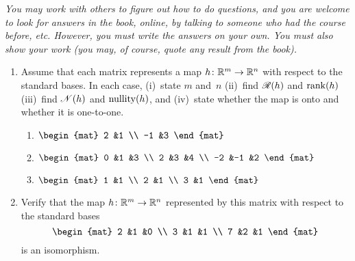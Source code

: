 \documentclass[11pt]{article}
\begin{document}
\thispagestyle{empty}

\vspace*{3ex}
\textit{You may work with others to figure out how to do questions, 
and you are welcome to look for answers in the book, online, by talking
to someone who had the course before, etc.
However, you must write 
the answers on your own.
You must also show your work (you may, of course, 
quote any result from the book).}

\begin{enumerate}
\item
  Assume that each matrix represents a map $\mbox{$h\colon \mathbb{R}^m\to \mathbb{R}^n$}$
  with respect to the standard bases.
  In each case, 
  (i)~state $m$ and~$n$
  (ii)~find $\mathscr{R}(h)$ and $\operatorname{rank}(h)$
  (iii)~find $\mathscr{N}(h)$ and $\operatorname{nullity}(h)$,
  and (iv)~state whether the map is onto and whether it is one-to-one.
  \begin{enumerate}
  \item
    $
    \begin{mat}
      2  &1  \\ 
      -1 &3
    \end{mat}
    $
  \item
    $
    \begin{mat}
      0  &1  &3  \\ 
      2  &3  &4  \\
     -2  &-1 &2 
    \end{mat}
    $
  \item
    $
    \begin{mat}
      1  &1  \\ 
      2  &1  \\
      3  &1
    \end{mat}
    $
  \end{enumerate}

\item Verify that the map $\mbox{$h\colon \mathbb{R}^m\to \mathbb{R}^n$}$ represented by this matrix
  with respect to the standard bases
  \begin{equation*}
    \begin{mat}
      2  &1  &0  \\
      3  &1  &1  \\
      7  &2  &1
    \end{mat}
  \end{equation*}
  is an isomorphism. 


\end{enumerate}
\end{document}
